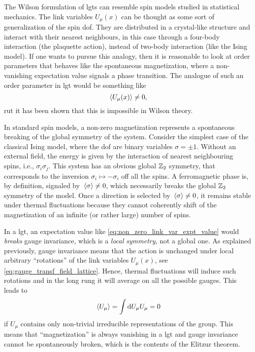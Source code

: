 The Wilson formulation of \ac{lgt}s can resemble spin models studied in statistical mechanics.
The link variables $U_{\mu}(x)$ can be thought as some sort of generalization of the spin \ac{dof}.
They are distributed in a crystal-like structure and interact with their nearest neighbours, in this case through a four-body interaction (the plaquette action), instead of two-body interaction (like the Ising model).
If one wants to pursue this analogy, then it is reasonable to look at order parameters that behaves like the spontaneous magnetization, where a non-vanishing expectation value signals a phase transition.
The analogue of such an order parameter in \ac{lgt} would be something like
\begin{equation}
    \ev*{U_{\mu}(x)} \neq 0,
    \label{eq:non_zero_link_var_expt_value}
\end{equation}
rut it has been shown\citneeded {} that this is impossible in Wilson theory.

In standard spin models, a non-zero magnetization represents a spontaneous breaking of the global symmetry of the system.
Consider the simplest case of the classical Ising model, where the \ac{dof} are binary variables $\sigma = \pm 1$.
Without an external field, the energy is given by the interaction of nearest neighbouring spins, i.e., $\sigma_i \sigma_j$.
This system has an obvious global $\mathbb{Z}_2$ symmetry, that corresponds to the inversion $\sigma_i \mapsto -\sigma_i$ off all the spins.
A ferromagnetic phase is, by definition, signaled by $\ev*{\sigma} \neq 0$, which necessarily breaks the global $\mathbb{Z}_2$ symmetry of the model.
Once a direction is selected by $\ev*{\sigma} \neq 0$, it remains stable under thermal fluctuations because they cannot coherently shift of the magnetization of an infinite (or rather large) number of spins.

In a \ac{lgt}, an expectation value like \eqref{eq:non_zero_link_var_expt_value} would \emph{breaks} gauge invariance, which is a \emph{local symmetry}, not a global one.
As explained previously, gauge invariance means that the action is unchanged under local arbitrary ``rotations'' of the link variables $U_{\mu}(x)$, see \eqref{eq:gauge_transf_field_lattice}.
Hence, thermal fluctuations will induce such rotations and in the long rung it will average on all the possible gauges.
This leads to
\begin{equation}
    \ev*{U_{\mu}} = \int \dd U_{\mu} U_{\mu} = 0
\end{equation}
if $U_{\mu}$ contains only non-trivial irreducible representations of the group.
This means that ``magnetization'' is always vanishing in a \ac{lgt} and gauge invariance cannot be spontaneously broken, which is the contents of the Elitzur theorem\citneeded.

